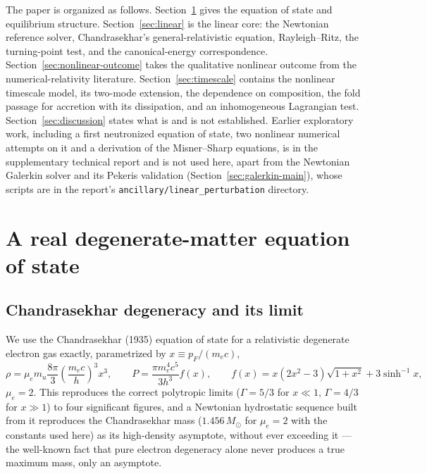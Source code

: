 \documentclass[11pt]{article}
\begin{document}
The paper is organized as follows. Section~\ref{sec:eos} gives the equation of state and equilibrium structure. Section~\ref{sec:linear} is the linear core: the Newtonian reference solver, Chandrasekhar's general-relativistic equation, Rayleigh--Ritz, the turning-point test, and the canonical-energy correspondence. Section~\ref{sec:nonlinear-outcome} takes the qualitative nonlinear outcome from the numerical-relativity literature. Section~\ref{sec:timescale} contains the nonlinear timescale model, its two-mode extension, the dependence on composition, the fold passage for accretion with its dissipation, and an inhomogeneous Lagrangian test. Section~\ref{sec:discussion} states what is and is not established. Earlier exploratory work, including a first neutronized equation of state, two nonlinear numerical attempts on it and a derivation of the Misner--Sharp equations, is in the supplementary technical report \citep{OwnbyPhase2} and is not used here, apart from the Newtonian Galerkin solver and its Pekeris validation (Section~\ref{sec:galerkin-main}), whose scripts are in the report's \texttt{ancillary/linear\_perturbation} directory.

\section{A real degenerate-matter equation of state}
\label{sec:eos}

\subsection{Chandrasekhar degeneracy and its limit}

We use the Chandrasekhar (1935) equation of state for a relativistic degenerate electron gas exactly, parametrized by $x\equiv p_F/(m_ec)$,
\begin{equation}
\rho=\mu_em_u\frac{8\pi}{3}\left(\frac{m_ec}{h}\right)^3x^3,\qquad P=\frac{\pi m_e^4c^5}{3h^3}f(x),\qquad f(x)=x(2x^2-3)\sqrt{1+x^2}+3\sinh^{-1}x,
\end{equation}
$\mu_e=2$. This reproduces the correct polytropic limits ($\Gamma=5/3$ for $x\ll1$, $\Gamma=4/3$ for $x\gg1$) to four significant figures, and a Newtonian hydrostatic sequence built from it reproduces the Chandrasekhar mass ($1.456\,M_\odot$ for $\mu_e=2$ with the constants used here) as its high-density asymptote, without ever exceeding it --- the well-known fact that pure electron degeneracy alone never produces a true maximum mass, only an asymptote.
\end{document}

